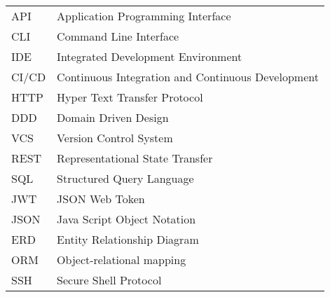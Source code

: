 \begin{longtable}{p{3cm}p{10cm}}
    API&Application Programming Interface\\
    CLI&Command Line Interface\\
    IDE&Integrated Development Environment\\
    CI/CD&Continuous Integration and Continuous Development\\
    HTTP&Hyper Text Transfer Protocol\\
    DDD&Domain Driven Design\\
    VCS&Version Control System\\
    REST&Representational State Transfer\\
    SQL&Structured Query Language\\
    JWT&JSON Web Token\\
    JSON&Java Script Object Notation\\
    ERD&Entity Relationship Diagram\\
    ORM&Object-relational mapping\\
    SSH&Secure Shell Protocol\\
\end{longtable}
\addtocounter{table}{-1}
